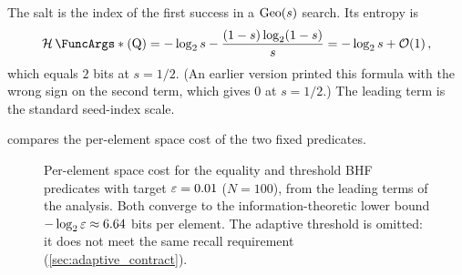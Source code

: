 \begin{remark}
\label{rem:info_interp}
The salt is the index of the first success in a $\mathrm{Geo}(s)$ search.
Its entropy is
\begin{equation}
    \Entropy(\RV{Q})
    = -\log_2 s - \frac{(1-s)\log_2(1-s)}{s}
    = -\log_2 s + \mathcal{O}(1)\,,
\end{equation}
which equals $2$ bits at $s = 1/2$.
(An earlier version printed this formula with the wrong sign on the second
term, which gives $0$ at $s = 1/2$.)
The leading term is the standard seed-index scale.
\end{remark}

 compares the per-element space cost of the two
fixed predicates.

\begin{figure}[ht]
\centering
{}
\caption{Per-element space cost for the equality and threshold BHF
    predicates with target $\varepsilon = 0.01$ ($N = 100$), from the leading
    terms of the analysis.
    Both converge to the information-theoretic lower bound
    $-\log_2\varepsilon \approx 6.64$ bits per element.
    The adaptive threshold is omitted: it does not meet the same recall
    requirement (\cref{sec:adaptive_contract}).}
\label{fig:space_comparison}
\end{figure}

